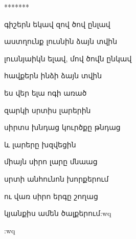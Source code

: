 
\centerline{*******}

գիշերն եկավ զով ծով ընլավ

աստղունք լուսնին ձայն տվին



լուսնյաիկն ելավ, մով ծովն ընկավ


հավքերն ինձի  ձայն տվին




ես վեր ելա ոգի առած 



զարկի սրտիս լարերին



 սիրտս խնդաց կուրծքը թնդաց


և լարերը խզվեցին





միայն սիրո լարը մնաաց



սրտի անհունոն խորքերում



     ու վառ սիրո երգը  շողաց


կյանքիս ամեն ծալքերում:wq



:wq




